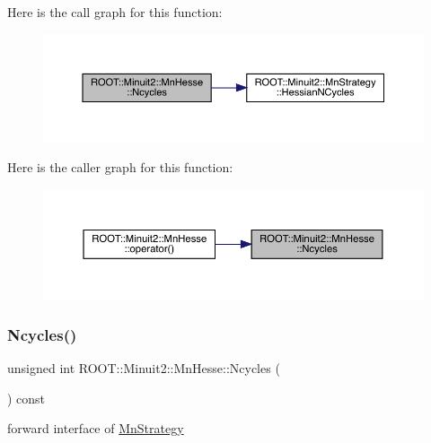 Here is the call graph for this function\+:
\nopagebreak
\begin{figure}[H]
\begin{center}
\leavevmode
\includegraphics[width=350pt]{d1/d02/classROOT_1_1Minuit2_1_1MnHesse_a5a84b9459469f2edf55f28d8d579a00d_cgraph}
\end{center}
\end{figure}
Here is the caller graph for this function\+:
\nopagebreak
\begin{figure}[H]
\begin{center}
\leavevmode
\includegraphics[width=350pt]{d1/d02/classROOT_1_1Minuit2_1_1MnHesse_a5a84b9459469f2edf55f28d8d579a00d_icgraph}
\end{center}
\end{figure}
\mbox{\label{classROOT_1_1Minuit2_1_1MnHesse_a5a84b9459469f2edf55f28d8d579a00d}} 
\subsubsection{\texorpdfstring{Ncycles()}{Ncycles()}\hspace{0.1cm}{\footnotesize\ttfamily [2/3]}}
{\footnotesize\ttfamily unsigned int R\+O\+O\+T\+::\+Minuit2\+::\+Mn\+Hesse\+::\+Ncycles (\begin{DoxyParamCaption}{ }\end{DoxyParamCaption}) const\hspace{0.3cm}{\ttfamily [inline]}}



forward interface of \mbox{\hyperlink{classROOT_1_1Minuit2_1_1MnStrategy}{Mn\+Strategy}} 

